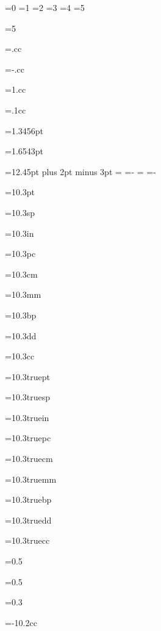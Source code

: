 
=0
=1
=2
=3
=4
=5

=5
\showthe{}

=.cc
\showthe{}

=-.cc
\showthe{}

=1.cc
\showthe{}

=.1cc
\showthe{}

=1.3456pt
\showthe{}

=1.6543pt
\showthe{}

=12.45pt plus 2pt minus 3pt
\showthe{}
=
\showthe{}
=-
\showthe{}
=
\showthe{}
=-
\showthe{}

=10.3pt
\showthe{}

=10.3sp
\showthe{}

=10.3in
\showthe{}

=10.3pc
\showthe{}

=10.3cm
\showthe{}

=10.3mm
\showthe{}

=10.3bp
\showthe{}

=10.3dd
\showthe{}

=10.3cc
\showthe{}


=10.3truept
\showthe{}

=10.3truesp
\showthe{}

=10.3truein
\showthe{}

=10.3truepc
\showthe{}

=10.3truecm
\showthe{}

=10.3truemm
\showthe{}

=10.3truebp
\showthe{}

=10.3truedd
\showthe{}

=10.3truecc
\showthe{}

=0.5
\showthe{}

=0.5
\showthe{}

=0.3
\showthe{}

=-10.2cc
\showthe{}

